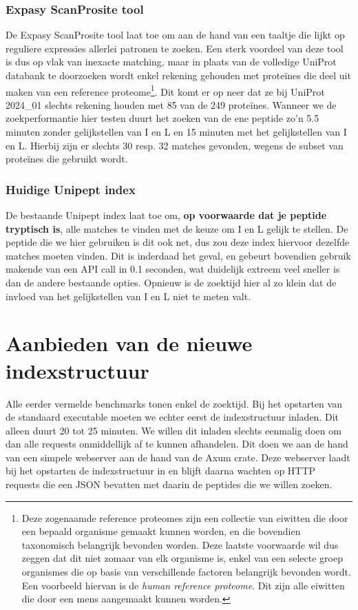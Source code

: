 \subsubsection{Expasy ScanProsite tool}
De Expasy ScanProsite tool\cite{scanprosite} laat toe om aan de hand van een taaltje die lijkt op reguliere expressies allerlei patronen te zoeken.
Een sterk voordeel van deze tool is dus op vlak van inexacte matching, maar in plaats van de volledige UniProt databank te doorzoeken wordt enkel rekening gehouden met proteïnes die deel uit maken van een reference proteome\footnote{Deze zogenaamde reference proteomes zijn een collectie van eiwitten die door een bepaald organisme gemaakt kunnen worden, en die bovendien taxonomisch belangrijk bevonden worden. Deze laatste voorwaarde wil dus zeggen dat dit niet zomaar van elk organisme is, enkel van een selecte groep organismes die op basis van verschillende factoren belangrijk bevonden wordt. Een voorbeeld hiervan is de \textit{human reference proteome}. Dit zijn alle eiwitten die door een mens aangemaakt kunnen worden.}.
Dit komt er op neer dat ze bij UniProt 2024\_01 slechts rekening houden met 85 van de 249 proteïnes.
Wanneer we de zoekperformantie hier testen duurt het zoeken van de ene peptide zo'n 5.5 minuten zonder gelijkstellen van I en L en 15 minuten met het gelijkstellen van I en L\@.
Hierbij zijn er slechts 30 resp. 32 matches gevonden, wegens de subset van proteïnes die gebruikt wordt.

\subsubsection{Huidige Unipept index}
De bestaande Unipept index laat toe om, \textbf{op voorwaarde dat je peptide tryptisch is}, alle matches te vinden met de keuze om I en L gelijk te stellen.
De peptide die we hier gebruiken is dit ook net, dus zou deze index hiervoor dezelfde matches moeten vinden.
Dit is inderdaad het geval, en gebeurt bovendien gebruik makende van een API call in 0.1 seconden, wat duidelijk extreem veel sneller is dan de andere bestaande opties.
Opnieuw is de zoektijd hier al zo klein dat de invloed van het gelijkstellen van I en L niet te meten valt.


\section{Aanbieden van de nieuwe indexstructuur}\label{sec:aanbieden-van-de-nieuwe-indexstructuur}
Alle eerder vermelde benchmarks tonen enkel de zoektijd.
Bij het opstarten van de standaard executable moeten we echter eerst de indexstructuur inladen.
Dit alleen duurt 20 tot 25 minuten.
We willen dit inladen slechts eenmalig doen om dan alle requests onmiddellijk af te kunnen afhandelen.
Dit doen we aan de hand van een simpele webserver aan de hand van de Axum crate\cite{axum}.
Deze webserver laadt bij het opstarten de indexstructuur in en blijft daarna wachten op HTTP requests die een JSON bevatten met daarin de peptides die we willen zoeken.


